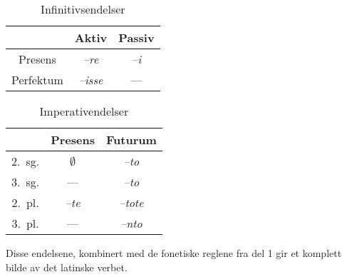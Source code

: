 \documentclass[a4paper]{article}
\begin{document}
\begin{table}[hp]
\begin{center}
\begin{tabular}{|c|c|c|}
    \hline
          & Aktiv        & Passiv \\
    \hline
Presens   & \emph{--re}  & \emph{--i} \\
Perfektum & \emph{--isse} & --- \\
    \hline
\end{tabular}
\caption{Infinitivsendelser}
\label{infinitiv}
\end{center}
\end{table}

\begin{table}[hp]
\begin{center}
\begin{tabular}{|c|c|c|}
    \hline
       & Presens & Futurum \\
    \hline
2.~sg. & $\emptyset$ & \emph{--to} \\
3.~sg. & ---        & \emph{--to} \\
2.~pl. & \emph{--te} & \emph{--tote} \\
3.~pl. & ---         & \emph{--nto} \\
    \hline
\end{tabular}
\caption{Imperativendelser}
\label{imperativ}
\end{center}
\end{table}

Disse endelsene, kombinert med de fonetiske reglene fra del 1 gir et komplett
bilde av det latinske verbet.


{}
\end{document}
